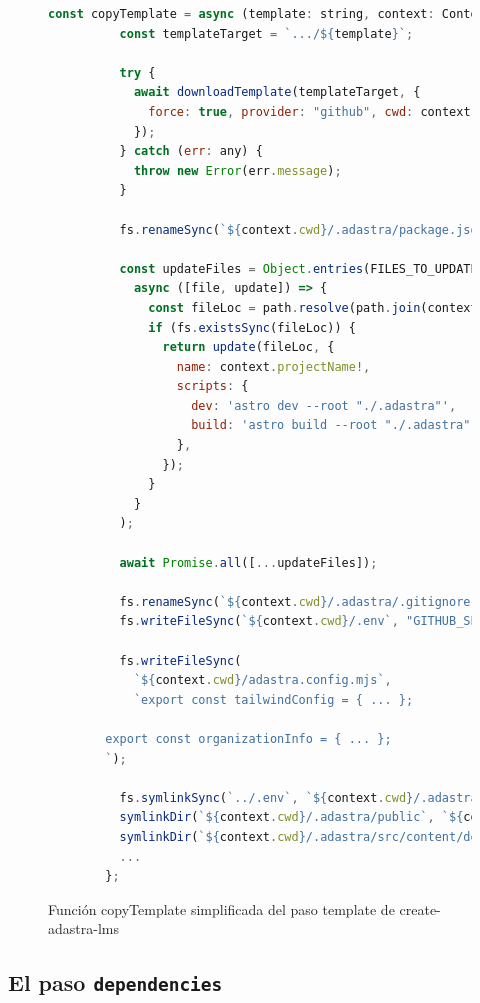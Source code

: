 \begin{figure}
    \begin{lstlisting}[language=Javascript]
        const copyTemplate = async (template: string, context: Context) => {
          const templateTarget = `.../${template}`;
        
          try {
            await downloadTemplate(templateTarget, {
              force: true, provider: "github", cwd: context.cwd, dir: "./.adastra"
            });
          } catch (err: any) {
            throw new Error(err.message);
          }
        
          fs.renameSync(`${context.cwd}/.adastra/package.json`,`${context.cwd}/package.json`);
        
          const updateFiles = Object.entries(FILES_TO_UPDATE).map(
            async ([file, update]) => {
              const fileLoc = path.resolve(path.join(context.cwd, file));
              if (fs.existsSync(fileLoc)) {
                return update(fileLoc, {
                  name: context.projectName!,
                  scripts: {
                    dev: 'astro dev --root "./.adastra"',
                    build: 'astro build --root "./.adastra"',
                  },
                });
              }
            }
          );
        
          await Promise.all([...updateFiles]);
        
          fs.renameSync(`${context.cwd}/.adastra/.gitignore`,`${context.cwd}/.gitignore`);
          fs.writeFileSync(`${context.cwd}/.env`, "GITHUB_SECRET=\n");
        
          fs.writeFileSync(
            `${context.cwd}/adastra.config.mjs`,
            `export const tailwindConfig = { ... };
        
        export const organizationInfo = { ... };
        `);
        
          fs.symlinkSync(`../.env`, `${context.cwd}/.adastra/.env`, "file");
          symlinkDir(`${context.cwd}/.adastra/public`, `${context.cwd}/public`);
          symlinkDir(`${context.cwd}/.adastra/src/content/docs/1-activities/1-classes`,`${context.cwd}/classes`);
          ...
        };
    \end{lstlisting}
    \caption{Función copyTemplate simplificada del paso template de create-adastra-lms}
    \label{fig:adastraCreateTemplateCopy}
\end{figure}

\subsection{El paso {\tt dependencies}}

